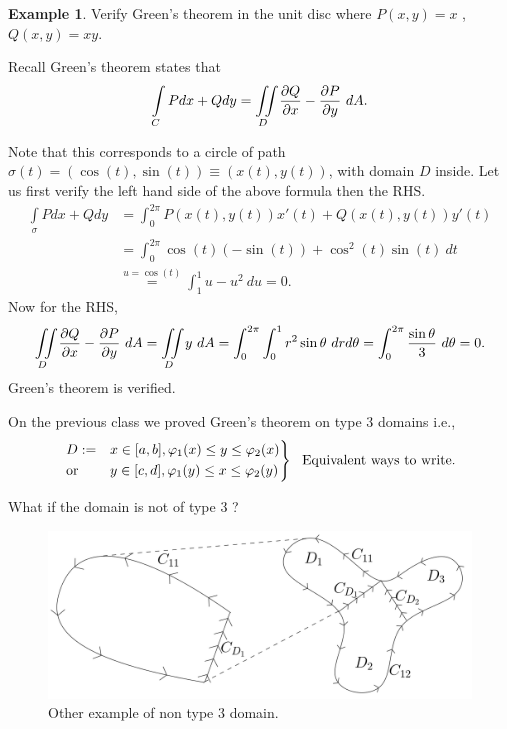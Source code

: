 \documentclass[
	12pt,
	]{article}
\theoremstyle{custom}
\theoremstyle{custom}
\theoremstyle{custom}
\theoremstyle{custom}
\theoremstyle{custom}
\theoremstyle{definition}
\newtheorem{example}{Example}[section]
\theoremstyle{example}
\theoremstyle{note}
\theoremstyle{remark}
\theoremstyle{example}
\newcounter{theo}[section]\setcounter{theo}{0}
\numberwithin{equation}{subsection}
\begin{document}
  				\begin{example}
  					Verify Green's theorem in the unit disc where $P(x,y) =x$ ,  $Q(x,y) = xy$.
  					
  					\noindent Recall Green's theorem states that 
  					$$ \int\limits_{C} Pdx +Qdy = \iint\limits_{D} \pdv{Q}{x} - \pdv{P}{y} \ dA.$$
  					
  					\noindent Note that this corresponds to a circle of path $\sigma(t) = (\cos(t),\sin(t)) \equiv (x(t),y(t))$, with domain $D$ inside. Let us first verify the left hand side of the above formula then the RHS.
  					\begin{align*}
  						\int\limits_{\sigma}Pdx + Qdy &= \int_{0}^{2\pi}P(x(t), y(t))x'(t) + Q(x(t) ,y(t))y'(t)\\
  						&= \int_{0}^{2\pi}\cos(t)(-\sin(t))+ \cos^{2}(t)\sin(t) \ dt\\
  						&\stackrel{u = \cos(t)}{=} \int_{1}^{1}u-u^{2} \ du =0.
  					\end{align*}
  					Now for the RHS,
  					$$ \iint\limits_{D} \pdv{Q}{x} - \pdv{P}{y} \ dA = \iint\limits_{D} y \ dA = \int_{0}^{2\pi}\int_{0}^{1} r^{2}\sin \theta \ drd\theta =\int_{0}^{2\pi}\frac{\sin\theta}{3}\ d\theta = 0.$$
  					Green's theorem is verified. 
  				\end{example}
  				
  				\noindent On the previous class we proved Green's theorem on type $3$ domains i.e.,
  				\begin{equation*}
  					\begin{rcases}
  						D:= &x\in [a,b] , \varphi_{1}(x) \le y \le \varphi_{2}(x) \\
  						\text{or} \ &y\in [c,d]  , \varphi_{1}(y) \le x \le \varphi_{2}(y)
  					\end{rcases} \ \ \text{Equivalent ways to write.}
  				\end{equation*}
  				
  				What if the domain is not of type $3$ ? 
  				\begin{figure}[H]
  					\centering
  					\includegraphics[width=0.8\linewidth]{MATH314_Notes_Triple_Integral_Example9_Figure.png}
  					\caption{Other example of non type $3$ domain.}
  					\captionsetup{margin = 1cm}
  				\end{figure}
  				
\end{document}
